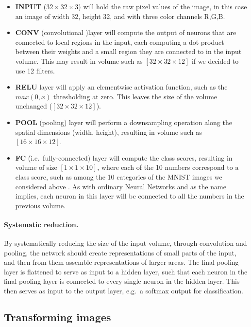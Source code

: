 \documentclass[%
oneside,                 %
final,                   %
10pt]{article}
\begin{document}
\begin{itemize}
\item \textbf{INPUT} ($32\times 32 \times 3$) will hold the raw pixel values of the image, in this case an image of width 32, height 32, and with three color channels R,G,B.

\item \textbf{CONV} (convolutional )layer will compute the output of neurons that are connected to local regions in the input, each computing a dot product between their weights and a small region they are connected to in the input volume. This may result in volume such as $[32\times 32\times 12]$ if we decided to use 12 filters.

\item \textbf{RELU} layer will apply an elementwise activation function, such as the $max(0,x)$ thresholding at zero. This leaves the size of the volume unchanged ($[32\times 32\times 12]$).

\item \textbf{POOL} (pooling) layer will perform a downsampling operation along the spatial dimensions (width, height), resulting in volume such as $[16\times 16\times 12]$.

\item \textbf{FC} (i.e.~fully-connected) layer will compute the class scores, resulting in volume of size $[1\times 1\times 10]$, where each of the 10 numbers correspond to a class score, such as among the 10 categories of the MNIST images we considered above . As with ordinary Neural Networks and as the name implies, each neuron in this layer will be connected to all the numbers in the previous volume.
\end{itemize}

\noindent
\paragraph{Systematic reduction.}
By systematically reducing the size of the input volume, through
convolution and pooling, the network should create representations of
small parts of the input, and then from them assemble representations
of larger areas.  The final pooling layer is flattened to serve as
input to a hidden layer, such that each neuron in the final pooling
layer is connected to every single neuron in the hidden layer. This
then serves as input to the output layer, e.g.~a softmax output for
classification.

\subsection{Transforming images}
\end{document}

